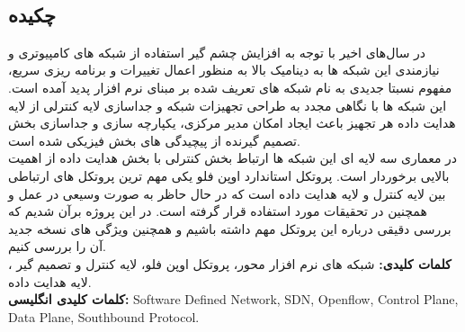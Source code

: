 
\setcounter{page}{1}
\thispagestyle{empty}

~\vfill

\subsection*{چکیده}
\begin{small}
\baselineskip=0.7cm

در سال‌های اخیر با توجه به افزایش چشم گیر استفاده از شبکه های کامپیوتری و نیازمندی این شبکه ها به دینامیک بالا به منظور اعمال تغییرات و برنامه ریزی سریع، مفهوم نسبتا جدیدی به نام شبکه های تعریف شده بر مبنای نرم افزار  پدید آمده است. این شبکه ها با نگاهی مجدد به طراحی تجهیزات شبکه و جداسازی لایه کنترلی  از لایه هدایت داده  هر تجهیز باعث ایجاد امکان مدیر مرکزی، یکپارچه سازی و جداسازی بخش تصمیم گیرنده از پیچیدگی های بخش فیزیکی شده است.\\
در معماری سه لایه ای این شبکه ها ارتباط بخش کنترلی با بخش هدایت داده از اهمیت بالایی برخوردار است. پروتکل استاندارد اوپن فلو  یکی مهم ترین پروتکل های ارتباطی بین لایه کنترل و لایه هدایت داده است که در حال حاظر به صورت وسیعی در عمل و همچنین در تحقیقات مورد استفاده قرار گرفته است. در این پروژه برآن شدیم که بررسی دقیقی درباره این پروتکل مهم داشته باشیم و همچنین ویژگی های نسخه جدید آن را بررسی کنیم.\\

\noindent\textbf{کلمات کلیدی:} شبکه های نرم افزار محور، پروتکل اوپن فلو، لایه کنترل و تصمیم گیر ، لایه هدایت داده. \\
\noindent\textbf{کلمات کلیدی انگلیسی:} Software Defined Network, SDN, Openflow, Control Plane, Data Plane, Southbound Protocol.\\

\end{small}
